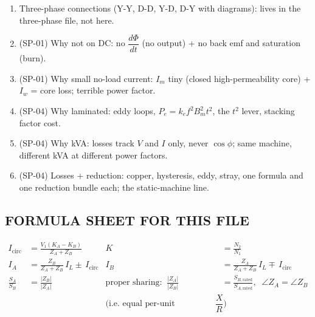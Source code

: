 \documentclass[11pt]{article}
\begin{document}
\begin{enumerate}[label=\textbf{Q\arabic*.}]
\item [3ph file] Three-phase connections (Y-Y, D-D, Y-D, D-Y with diagrams): lives in the three-phase file, not here.
\item (SP-01) Why not on DC: no $\dfrac{d\Phi}{dt}$ (no output) + no back emf and saturation (burn).
\item (SP-01) Why small no-load current: $I_m$ tiny (closed high-permeability core) + $I_w$ = core loss; terrible power factor.
\item (SP-04) Why laminated: eddy loops, $P_e = k_e f^{2} B_m^{2} t^{2}$, the $t^{2}$ lever, stacking factor cost.
\item (SP-04) Why kVA: losses track $V$ and $I$ only, never $\cos\phi$; same machine, different kVA at different power factors.
\item (SP-04) Losses + reduction: copper, hysteresis, eddy, stray, one formula and one reduction bundle each; the static-machine line.
\end{enumerate}

\subsection*{\color{copper}FORMULA SHEET FOR THIS FILE}
\begin{align*}
I_{\text{circ}} &= \frac{V_1\left(K_A - K_B\right)}{Z_A + Z_B}
& K &= \frac{N_2}{N_1} \\[4pt]
I_A &= \frac{Z_B}{Z_A + Z_B}\, I_L \pm\, I_{\text{circ}}
& I_B &= \frac{Z_A}{Z_A + Z_B}\, I_L \mp\, I_{\text{circ}} \\[4pt]
\frac{S_A}{S_B} &= \frac{\left|Z_B\right|}{\left|Z_A\right|}
& \text{proper sharing:}\;\; \frac{\left|Z_A\right|}{\left|Z_B\right|} &= \frac{S_{B,\text{rated}}}{S_{A,\text{rated}}},\;\; \angle Z_A = \angle Z_B \\[4pt]
&& \text{(i.e. equal per-unit impedance on own base, equal } \dfrac{X}{R}\text{)}
\end{align*}
\end{document}
